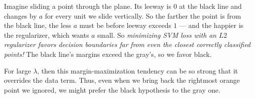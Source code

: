   Imagine sliding a point through the plane.  Its leeway is $0$ at the
  black line and changes by $a$ for every unit we slide vertically.
  So the farther the point is from the black line, the less $a$
  must be before leeway exceeds $1$ --- and the happier is
  the regularizer, which wants $a$ small.
  So \emph{minimizing SVM loss with an $L2$ regularizer favors decision
  boundaries far from even the closest correctly classified points!}  The black
  line's margins exceed the gray's, so we favor black.

  For large $\lambda$, then this margin-maximization tendency can be so
  strong that it overrides the data term.  Thus, even when we bring back
  the rightmost {\rng orange point} we ignored, we might prefer the black
  hypothesis to the gray one.


